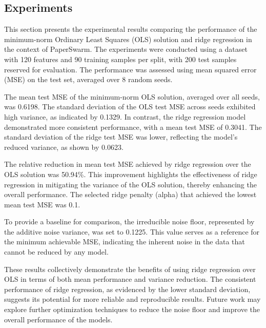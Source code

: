 \subsection{Experiments}

This section presents the experimental results comparing the performance of the minimum-norm Ordinary Least Squares (OLS) solution and ridge regression in the context of PaperSwarm. The experiments were conducted using a dataset with 120 features and 90 training samples per split, with 200 test samples reserved for evaluation. The performance was assessed using mean squared error (MSE) on the test set, averaged over 8 random seeds.

The mean test MSE of the minimum-norm OLS solution, averaged over all seeds, was 0.6198. The standard deviation of the OLS test MSE across seeds exhibited high variance, as indicated by 0.1329. In contrast, the ridge regression model demonstrated more consistent performance, with a mean test MSE of 0.3041. The standard deviation of the ridge test MSE was lower, reflecting the model's reduced variance, as shown by 0.0623.

The relative reduction in mean test MSE achieved by ridge regression over the OLS solution was 50.94\%. This improvement highlights the effectiveness of ridge regression in mitigating the variance of the OLS solution, thereby enhancing the overall performance. The selected ridge penalty (alpha) that achieved the lowest mean test MSE was 0.1.

To provide a baseline for comparison, the irreducible noise floor, represented by the additive noise variance, was set to 0.1225. This value serves as a reference for the minimum achievable MSE, indicating the inherent noise in the data that cannot be reduced by any model.

These results collectively demonstrate the benefits of using ridge regression over OLS in terms of both mean performance and variance reduction. The consistent performance of ridge regression, as evidenced by the lower standard deviation, suggests its potential for more reliable and reproducible results. Future work may explore further optimization techniques to reduce the noise floor and improve the overall performance of the models.
